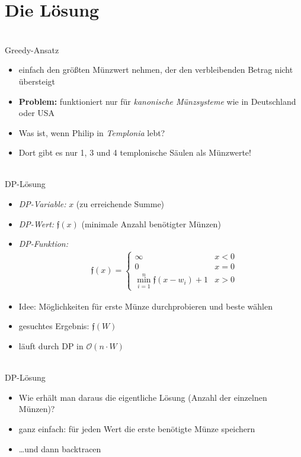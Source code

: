 \documentclass[hyphens,compress,fleqn]{beamer}
\begin{document}
	\section{Die Lösung}
	\begin{frame}{{\footnotesize\insertsectionhead\\}Greedy-Ansatz}
	\begin{itemize}[<+->]
		\item einfach den größten Münzwert nehmen, der den verbleibenden Betrag nicht übersteigt
		\item \textbf{Problem:} funktioniert nur für \textit{kanonische Münzsysteme} wie in Deutschland oder USA
		\item Was ist, wenn Philip in \textit{Templonia} lebt?
		\item Dort gibt es nur 1, 3 und 4 templonische Säulen als Münzwerte!
	\end{itemize}
	\end{frame}

	\begin{frame}{{\footnotesize\insertsectionhead\\}DP-Lösung}
	\begin{itemize}[<+->]
		\item \textit{DP-Variable:} $x$ (zu erreichende Summe)
		\item \textit{DP-Wert:} $\mathfrak{f}(x)$ (minimale Anzahl benötigter Münzen)
		\item \textit{DP-Funktion:}\begin{align*}
		& \mathfrak{f}(x) =
		\begin{cases}
		\infty & x < 0 \\
		0 & x = 0 \\
		\min_{i = 1}^{n} \mathfrak{f}(x-w_i) + 1 & x > 0
		\end{cases}
		\end{align*}
		\item Idee: Möglichkeiten für erste Münze durchprobieren und beste wählen
		\item gesuchtes Ergebnis: $\mathfrak{f}(W)$
		\item läuft durch DP in $\mathcal{O}(n\cdot W)$
	\end{itemize}
	\end{frame}

	\begin{frame}{{\footnotesize\insertsectionhead\\}DP-Lösung}
	\begin{itemize}[<+->]
		\item Wie erhält man daraus die eigentliche Lösung (Anzahl der einzelnen Münzen)?
		\item ganz einfach: für jeden Wert die erste benötigte Münze speichern
		\item \dots und dann backtracen
	\end{itemize}
	\end{frame}
\end{document}
